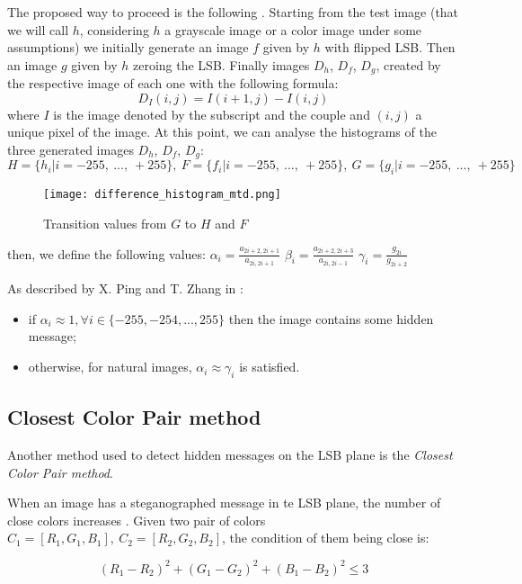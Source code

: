 \documentclass[../../main.tex]{subfiles}
\begin{document}
The proposed way to proceed is the following
\cite{new-detection-lsb-steganography}. 
Starting from the test image (that we will call $h$, considering $h$ a grayscale image or a color image under
some assumptions) we initially generate an image $f$ given by $h$ with flipped LSB. 
Then an image $g$ given by $h$ zeroing the LSB. Finally images $D_h$, $D_f$, $D_g$, 
created by the respective image of each one with the following formula:
          \[ D_{I}(i,j) = I(i+1,j) - I(i,j) \]
where $I$ is the image denoted by the subscript and the couple and
$(i,j)$ a unique pixel of the image.
At this point, we can analyse the histograms of the three generated images
$D_h$, $D_f$, $D_g$:
\[
    H = \{h_i | i = -255,\ ...,\ +255\},\ 
    F = \{f_i | i = -255,\ ...,\ +255\},\ 
    G = \{g_i | i = -255,\ ...,\ +255\}
\]

\begin{figure}[h]
    \centering
    \caption{Transition values from $G$ to $H$ and $F$}
    \texttt{[image: difference\_histogram\_mtd.png]}
\end{figure}

then, we define the following values: $\alpha_i = \frac{a_{2i+2,2i+1}}{a_{2i,2i+1}}$ $ \beta_i = \frac{a_{2i+2,2i+3}}{a_{2i,2i-1}}$ $\gamma_i = \frac{g_{2i}}{g_{2i+2}}$


As described by X. Ping and T. Zhang in
\cite{new-detection-lsb-steganography}:
\begin{itemize}[noitemsep]
    \item if $\alpha_i \approx 1, \forall i \in \{-255, -254, ..., 255\}$
          then the image contains some hidden message;
    \item otherwise, for natural images, $\alpha_i \approx \gamma_i$ is
          satisfied.
\end{itemize}

\subsection{Closest Color Pair method}
Another method used to detect hidden messages on the LSB plane is the
\emph{Closest Color Pair method}.

When an image has a steganographed message in te LSB plane, the number of
close colors increases \cite{detecting-lsb-steganography}. Given two pair of
colors $C_1=[R_1,G_1,B_1],\ C_2=[R_2,G_2,B_2]$, the condition of them being
close is:

\[ (R_1-R_2)^2+(G_1-G_2)^2+(B_1-B_2)^2 \leq 3 \]
\end{document}
